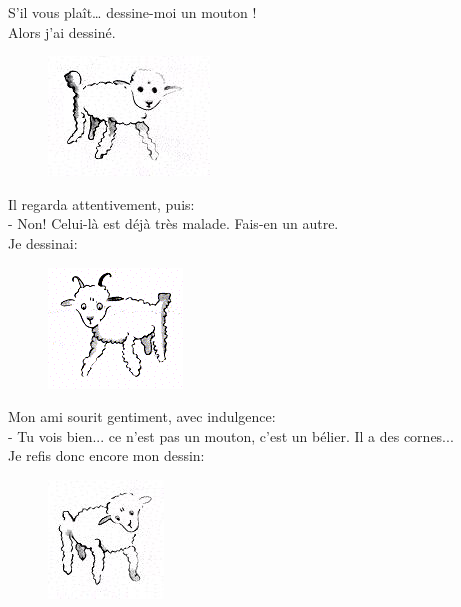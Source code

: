 \begin{multicols}{2}
  \og S'il vous plaît… dessine-moi un mouton ! \fg\\
  Alors j'ai dessiné.
  
  \begin{figure}[H]
    \centering
    \includegraphics[width=0.3\linewidth]{4x5-calcul-litteral/mouton2.png}
  \end{figure}

  Il regarda attentivement, puis: \\
  - Non! Celui-là est déjà très malade. Fais-en un autre. \\
  Je dessinai:

  \begin{figure}[H]
    \centering
    \includegraphics[width=0.3\linewidth]{4x5-calcul-litteral/mouton1.png}
  \end{figure}

  Mon ami sourit gentiment, avec indulgence: \\
  - Tu vois bien... ce n'est pas un mouton, c'est un bélier. Il a des cornes... \\
  Je refis donc encore mon dessin:

  \begin{figure}[H]
    \centering
    \includegraphics[width=0.3\linewidth]{4x5-calcul-litteral/mouton3.png}
  \end{figure}
  

\end{multicols}
